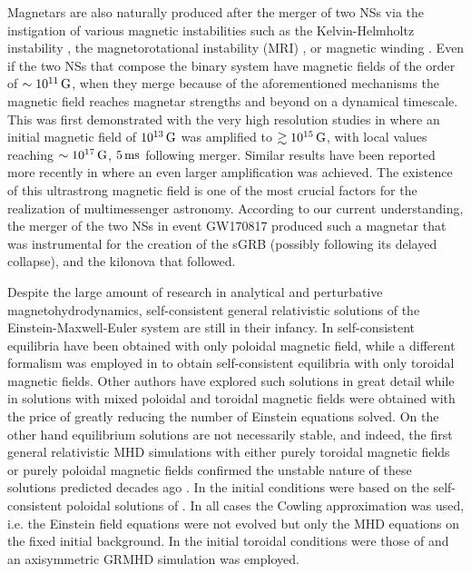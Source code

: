 \documentclass[twocolumn,superscriptaddress,showpacs,prl,aps,amsmath,amssymb,nofootinbib]{revtex4-1}
\begin{document}
Magnetars are also naturally produced after the merger of two NSs via
the instigation of various magnetic instabilities such as the Kelvin-Helmholtz
instability \cite{Price:2006fi,Anderson:2008zp,Kiuchi:2015sga,Kiuchi:2015qua,Dionysopoulou:2015tda}, the
magnetorotational instability (MRI) \cite{Shibata:2005mz,dlsss06a,Siegel:2013nrw,Kiuchi:2015qua}, or
magnetic winding \cite{Baumgarte:1999cq,Shapiro:2000zh,Kiuchi:2015sga}. Even if the two
NSs that compose the binary system have magnetic fields of the order
of $\sim 10^{11}\,\rm G$, when they merge because of the aforementioned
mechanisms the magnetic field reaches magnetar strengths and beyond on a
dynamical timescale. This was first demonstrated with the very high resolution
studies in \cite{Kiuchi:2015qua,Kiuchi:2015sga} where an initial magnetic field
of $10^{13}\,\rm G$ was amplified to  $\gtrsim 10^{15} \,\rm G$, with local
values reaching $\sim 10^{17}\,\rm G$, $5\,\rm ms$ following merger.  Similar
results have been reported more recently in \cite{Aguilera-Miret:2020dhz} where
an even larger amplification was achieved. The existence of this ultrastrong
magnetic field is one of the most crucial factors for the realization of
multimessenger astronomy. According to our current understanding, the merger
of the two NSs in event GW170817 \cite{TheLIGOScientific:2017qsa}
produced such a magnetar that was instrumental for the creation of the sGRB 
\cite{Monitor:2017mdv} (possibly following its delayed collapse), and the kilonova \cite{Valenti:2017ngx,Metzger2018}
that followed.

Despite the large amount of research in analytical and perturbative
magnetohydrodynamics, self-consistent general relativistic solutions of the
Einstein-Maxwell-Euler system are still in their infancy. In \cite{Bocquet1995}
self-consistent equilibria have been obtained with only poloidal magnetic
field, while a different formalism was employed in
\cite{Kiuchi2008,Kiuchi2009a} to obtain self-consistent equilibria with only
toroidal magnetic fields. Other authors have explored such solutions in great
detail \cite{Cardall2001,Yasutake2010,Frieben2012,Chatterjee2014,Franzon2015}
while in \cite{Pili2014,Bucciantini2015,Pili2017} solutions with mixed poloidal and
toroidal magnetic fields were obtained with the price of greatly reducing the
number of Einstein equations solved. On the other hand equilibrium solutions
are not necessarily stable, and indeed, the first general
relativistic MHD simulations with either purely toroidal magnetic fields
\cite{Kiuchi2008b} or purely poloidal magnetic fields
\cite{Ciolfi2011,Lasky2011,Ciolfi2012,Lasky2012} confirmed the unstable nature of these
solutions predicted decades ago
\cite{Tayler_1957,Tayler1973,Wright1973,Markey1973,Markey1974,Flowers1977}.  In
\cite{Ciolfi2011,Lasky2011,Ciolfi2012,Lasky2012} the initial
conditions were based on the self-consistent poloidal solutions of
\cite{Bocquet1995}. In all cases the Cowling approximation was used, i.e. the
Einstein field equations were not evolved but only the MHD equations on the fixed
initial background.  In \cite{Kiuchi2008b} the initial toroidal conditions were
those of \cite{Kiuchi2008} and an axisymmetric GRMHD simulation was employed.
\end{document}
